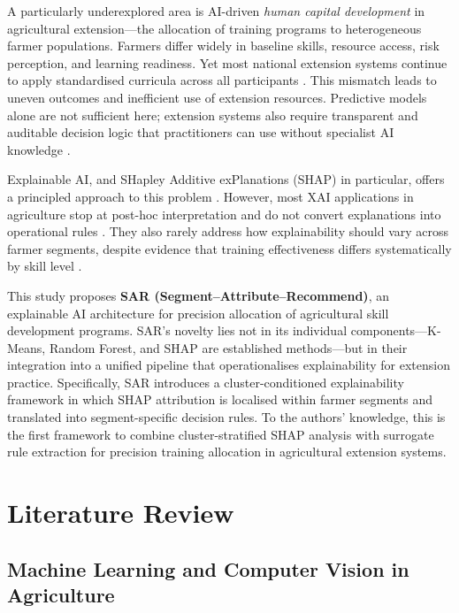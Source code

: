 \documentclass[3p,twocolumn,authoryear]{elsarticle}
\begin{document}
A particularly underexplored area is AI-driven \textit{human capital
development} in agricultural extension---the allocation of training programs
to heterogeneous farmer populations.
Farmers differ widely in baseline skills, resource access, risk perception,
and learning readiness.
Yet most national extension systems continue to apply standardised curricula
across all participants \citep{anderson2004,feder1985}.
This mismatch leads to uneven outcomes and inefficient use of extension
resources.
Predictive models alone are not sufficient here; extension systems also
require transparent and auditable decision logic that practitioners can use
without specialist AI knowledge \citep{arrieta2020,lundberg2020}.

Explainable AI, and SHapley Additive exPlanations (SHAP) in particular,
offers a principled approach to this problem
\citep{lundberg2017,guidotti2019}.
However, most XAI applications in agriculture stop at post-hoc
interpretation and do not convert explanations into operational rules
\citep{ryo2022,linardatos2021}.
They also rarely address how explainability should vary across farmer
segments, despite evidence that training effectiveness differs
systematically by skill level \citep{davis2012,arrieta2020}.

This study proposes \textbf{SAR (Segment--Attribute--Recommend)}, an
explainable AI architecture for precision allocation of agricultural skill
development programs.
SAR's novelty lies not in its individual components---K-Means, Random
Forest, and SHAP are established methods---but in their integration into
a unified pipeline that operationalises explainability for extension
practice.
Specifically, SAR introduces a cluster-conditioned explainability framework
in which SHAP attribution is localised within farmer segments and
translated into segment-specific decision rules.
To the authors' knowledge, this is the first framework to combine
cluster-stratified SHAP analysis with surrogate rule extraction for
precision training allocation in agricultural extension systems.

\section{Literature Review}

\subsection{Machine Learning and Computer Vision in Agriculture}
\end{document}
